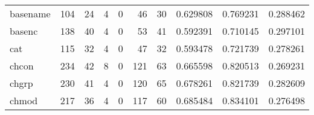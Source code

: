 \begin{tabular}{lrrrrrrrrr}
basename  &                                                104 &                                                 24 &                                                  4 &                                                  0 &                                                 46 &                                                 30 &                                           0.629808 &                               0.769231 &                             0.288462 \\
basenc    &                                                138 &                                                 40 &                                                  4 &                                                  0 &                                                 53 &                                                 41 &                                           0.592391 &                               0.710145 &                             0.297101 \\
cat       &                                                115 &                                                 32 &                                                  4 &                                                  0 &                                                 47 &                                                 32 &                                           0.593478 &                               0.721739 &                             0.278261 \\
chcon     &                                                234 &                                                 42 &                                                  8 &                                                  0 &                                                121 &                                                 63 &                                           0.665598 &                               0.820513 &                             0.269231 \\
chgrp     &                                                230 &                                                 41 &                                                  4 &                                                  0 &                                                120 &                                                 65 &                                           0.678261 &                               0.821739 &                             0.282609 \\
chmod     &                                                217 &                                                 36 &                                                  4 &                                                  0 &                                                117 &                                                 60 &                                           0.685484 &                               0.834101 &                             0.276498 \\

\end{tabular}
